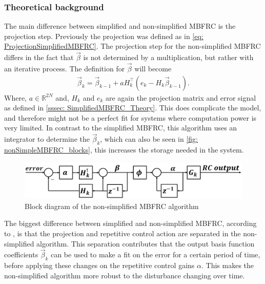 \documentclass[journal]{IEEEtran}
\begin{document}
\subsubsection{Theoretical background}\label{sssec: NonSimplifiedMBFRC_Theory}
The main difference between simplified and non-simplified MBFRC is the projection step. Previously the projection was defined as in \autoref{eq: ProjectionSimplifiedMBFRC}. The projection step for the non-simplified MBFRC differs in the fact that $\vec\beta$ is not determined by a multiplication, but rather with an iterative process. The definition for $\vec\beta$ will become 
\begin{equation}
\begin{aligned}\label{eq: ProjectionNonSimplifiedMBFRC}
    \vec\beta_k=\vec\beta_{k-1}+aH_k^\top (e_k-H_k\vec\beta_{k-1}).
\end{aligned}
\end{equation}
Where,  $a\in\mathbb{R}^{2N}$ and, $H_k$ and $e_k$ are again the projection matrix and error signal as defined in \autoref{sssec: SimplifiedMBFRC_Theory}. This does complicate the model, and therefore might not be a perfect fit for systems where computation power is very limited. In contrast to the simplified MBFRC, this algorithm uses an integrator to determine the $\vec\beta_k$, which can also be seen in \autoref{fig: nonSimpleMBFRC_blocks}, this increases the storage needed in the system. 
\begin{figure}[!t]
    \centering
    \includegraphics[width=1\linewidth]{figures/nonSimple_RC_MBFRC/non_simple_MBFRC_2.png}
    \caption{Block diagram of the non-simplified MBFRC algorithm}
    \label{fig: nonSimpleMBFRC_blocks}
\end{figure}

The biggest difference between simplified and non-simplified MBFRC, according to \cite{zwaans_frequency_nodate}, is that the projection and repetitive control action are separated in the non-simplified algorithm. This separation contributes that the output basis function coefficients $\vec\beta_k$ can be used to make a fit on the error for a certain period of time, before applying these changes on the repetitive control gains $\alpha$. This makes the non-simplified algorithm more robust to the disturbance changing over time.   
\end{document}
